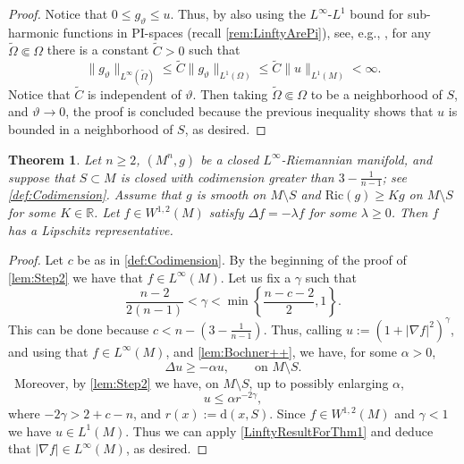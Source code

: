 \documentclass[12pt,a4paper,reqno]{amsart}
\newtheorem{theorem}{Theorem}[section]
\renewcommand{\leq}{\leqslant}
\renewcommand{\geq}{\geqslant}
\renewcommand{\tilde}{\widetilde}
\begin{document}
\begin{proof}
    Notice that $0\leq g_\vartheta\leq u$. Thus, by also using the $L^\infty$-$L^1$ bound for sub-harmonic functions in PI-spaces (recall \cref{rem:LinftyArePi}), see, e.g., \cite[Theorem A.4]{BenattiViolo}, for any $\tilde\Omega\Subset \Omega$ there is a constant $\tilde C>0$ such that
    \[
    \|g_\vartheta\|_{L^\infty(\tilde\Omega)} \leq \tilde C\|g_\vartheta\|_{L^1(\Omega)}\leq \tilde C\|u\|_{L^1(M)}<\infty.
    \]
    Notice that $\tilde C$ is independent of $\vartheta$.
    Then taking $\tilde\Omega\Subset \Omega$ to be a neighborhood of $S$, and $\vartheta\to 0$, the proof is concluded because the previous inequality shows that $u$ is bounded in a neighborhood of $S$, as desired.
\end{proof}

\begin{theorem}\label{thm:LipschitzRepresentativeThm1}
Let $n\geq 2$, $(M^n,g)$ be a closed $L^\infty$-Riemannian manifold, and suppose that $S\subset M$ is closed with codimension greater than $3-\frac{1}{n-1}$; see \cref{def:Codimension}. Assume that $g$ is smooth on $M\setminus S$ and $\mathrm{Ric}(g)\geq Kg$ on $M\setminus S$ for some $K\in\mathbb R$. Let $f\in W^{1,2}(M)$ satisfy $\Delta f = -\lambda f$ for some $\lambda \geq 0$. Then $f$ has a Lipschitz representative.
\end{theorem}
\begin{proof}
    Let $c$ be as in \cref{def:Codimension}. By the beginning of the proof of \cref{lem:Step2} we have that $f\in L^{\infty}(M)$. Let us fix a $\gamma$ such that
    \[
    \frac{n-2}{2(n-1)} < \gamma < \min\left\{\frac{n-c-2}{2},1\right\}.
    \]
    This can be done because $c< n-\left(3-\frac{1}{n-1}\right)$. Thus, calling $u:=(1+|\nabla f|^2)^\gamma$, and using that $f\in L^{\infty}(M)$, and \cref{lem:Bochner++}, we have, for some $\alpha>0$, 
    \[
    \Delta u \geq -\alpha u, \qquad \text{on $M\setminus S$}.
    \]\
    Moreover, by \cref{lem:Step2} we have, on $M\setminus S$, up to possibly enlarging $\alpha$,
    \[
    u\leq \alpha r^{-2\gamma},
    \]
    where $-2\gamma>2+c-n$, and $r(x):=\mathrm{d}(x,S)$. Since $f\in W^{1,2}(M)$ and $\gamma<1$ we have $u\in L^1(M)$. Thus we can apply \cref{LinftyResultForThm1} and deduce that $|\nabla f|\in L^{\infty}(M)$, as desired.
\end{proof}
\end{document}

